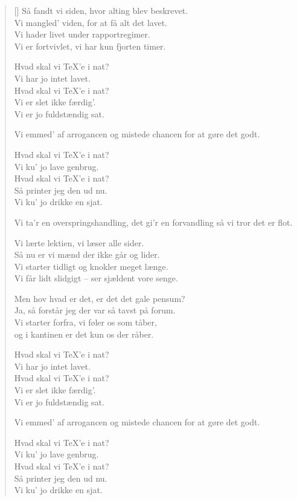{{\begin{multicols}
\begin{verse}[\versewidth]
Så fandt vi siden, hvor alting blev beskrevet.\\
Vi mangled' viden, for at få alt det lavet.\\
Vi hader livet under rapportregimer.\\
Vi er fortvivlet, vi har kun fjorten timer.

Hvad skal vi \TeX'e i nat?\\
Vi har jo intet lavet.\\
Hvad skal vi \TeX'e i nat?\\
Vi er slet ikke færdig'.\\
Vi er jo fuldstændig sat.

Vi emmed' af arrogancen og mistede chancen
for at gøre det godt.

Hvad skal vi \TeX'e i nat?\\
Vi ku' jo lave genbrug.\\
Hvad skal vi \TeX'e i nat?\\
Så printer jeg den ud nu.\\
Vi ku' jo drikke en sjat.

Vi ta'r en overspringshandling, det gi'r en forvandling
så vi tror det er flot.

Vi lærte lektien, vi læser alle sider.\\
Så nu er vi mænd der ikke går og lider.\\
Vi starter tidligt og knokler meget længe.\\
Vi får lidt slidgigt -- ser sjældent vore senge.

Men hov hvad er det, er det det gale pensum?\\
Ja, så forstår jeg der var så tavst på forum.\\
Vi starter forfra, vi føler os som tåber,\\
og i kantinen er det kun os der råber.

Hvad skal vi \TeX'e i nat?\\
Vi har jo intet lavet.\\
Hvad skal vi \TeX'e i nat?\\
Vi er slet ikke færdig'.\\
Vi er jo fuldstændig sat.

Vi emmed' af arrogancen og mistede chancen
for at gøre det godt.

Hvad skal vi \TeX'e i nat?\\
Vi ku' jo lave genbrug.\\
Hvad skal vi \TeX'e i nat?\\
Så printer jeg den ud nu.\\
Vi ku' jo drikke en sjat.


\end{verse}
\end{multicols}}}
